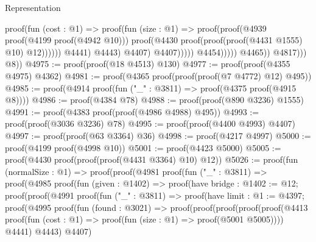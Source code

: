 \begin{lexlean}{Representation}
\begin{coremodule}
                                                            proof(fun (cost : @1) =>
                                                              proof(fun (size : @1) =>
                                                                proof(proof(@4939
                                                                      proof(@4199 proof(@4942 @10)))
                                                                    proof(@4430
                                                                        proof(proof(proof(@4431
                                                                                @1555)
                                                                              @10)
                                                                            @12))))))
                                                          @4441)
                                                        @4443)
                                                      @4407)
                                                    @4407)))))
                                      @4454)))))
                        @4465))
                  @4817)))
          @8))
@4975 := proof(proof(@18 @4513) @130)
@4977 := proof(proof(@4355 @4975) @4362)
@4981 := proof(@4365 proof(proof(proof(@7 @4772) @12) @495))
@4985 := proof(@4914 proof(fun ("_" : @3811) => proof(@4375 proof(@4915 @8))))
@4986 := proof(@4384 @78)
@4988 := proof(proof(@890 @3236) @1555)
@4991 := proof(@4383 proof(proof(@4986 @4988) @495))
@4993 := proof(proof(@3036 @3236) @78)
@4995 := proof(proof(@4400 @4993) @4407)
@4997 := proof(proof(@63 @3364) @36)
@4998 := proof(@4217 @4997)
@5000 := proof(@4199 proof(@4998 @10))
@5001 := proof(@4423 @5000)
@5005 := proof(@4430 proof(proof(proof(@4431 @3364) @10) @12))
@5026 := proof(fun (normalSize : @1) =>
    proof(proof(@4981
          proof(fun ("_" : @3811) =>
            proof(@4985
                proof(fun (given : @1402) =>
                  proof(have bridge : @1402 := @12;
                    proof(proof(@4991
                          proof(fun ("_" : @3811) =>
                            proof(have limit : @1 := @4397;
                              proof(@4995
                                  proof(fun (found : @3021) =>
                                    proof(proof(proof(proof(proof(@4413
                                                proof(fun (cost : @1) =>
                                                  proof(fun (size : @1) => proof(@5001 @5005))))
                                              @4441)
                                            @4443)
                                          @4407)

\end{coremodule}
\end{lexlean}
